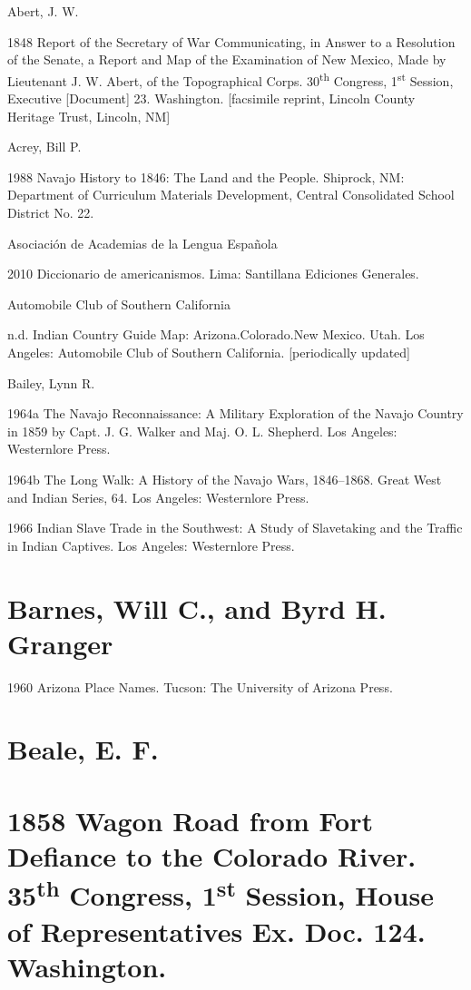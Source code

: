 Abert, J. W.  

1848  Report of the Secretary of War Communicating, in Answer to a Resolution of the Senate, a Report and Map of the Examination of New Mexico, Made by Lieutenant J. W. Abert, of the Topographical Corps.  30\textsuperscript{th} Congress, 1\textsuperscript{st} Session, Executive [Document] 23.  Washington.  [facsimile reprint, Lincoln County Heritage Trust, Lincoln, NM]

Acrey, Bill P.  

1988  Navajo History to 1846: The Land and the People.  Shiprock, NM:  Department of Curriculum Materials Development, Central Consolidated School District No. 22.

Asociación de Academias de la Lengua Española 

2010  Diccionario de americanismos.  Lima:  Santillana Ediciones Generales.

Automobile Club of Southern California

n.d.  Indian Country Guide Map: Arizona.Colorado.New Mexico. Utah.  Los Angeles:  Automobile Club of Southern California.  [periodically updated]

Bailey, Lynn R.  

1964a  The Navajo Reconnaissance: A Military Exploration of the Navajo Country in 1859 by Capt. J. G. Walker and Maj. O. L. Shepherd.  Los Angeles:  Westernlore Press.

1964b  The Long Walk: A History of the Navajo Wars, 1846–1868.  Great West and Indian Series, 64.  Los Angeles:  Westernlore Press.

1966  Indian Slave Trade in the Southwest: A Study of Slavetaking and the Traffic in Indian Captives.  Los Angeles:  Westernlore Press.

\section{Barnes, Will C., and Byrd H. Granger}

1960  Arizona Place Names.  Tucson:  The University of Arizona Press.

\section{Beale, E. F.}
\section{1858  Wagon Road from Fort Defiance to the Colorado River.  35\textsuperscript{th} Congress, 1\textsuperscript{st} Session, House of Representatives Ex. Doc. 124.  Washington.}
